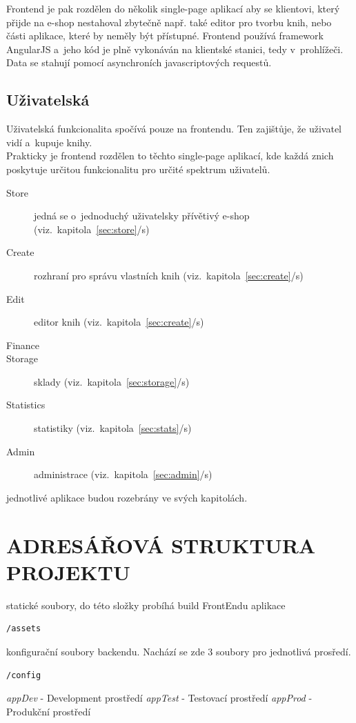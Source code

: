 \documentclass[a4paper,12pt,twoside,BCOR=10mm]{article}
\newcommand{\upc}[1]{\uppercase{#1}} %
\newcommand{\odkazNaKapitolu}[1]{(viz.~kapitola~\ref{#1}/s\pageref{#1})}
\renewcommand{\it}[1]{\textit{#1}}    %
\newenvironment{codeframe}{%
  \begin{Sbox} 
    \begin{minipage} 
      {\columnwidth-\leftmargin-\rightmargin-2\fboxsep-2\fboxrule-4pt} 
}{%

  \end{minipage} 
  \end{Sbox} 
  \begin{center} 
    \fcolorbox{black}{codeback}{\TheSbox} 
  \end{center} 
}
\begin{document}
Frontend je pak rozdělen do několik single-page aplikací aby se klientovi, který přijde na e-shop nestahoval zbytečně např. také editor pro tvorbu knih, nebo části aplikace, které by neměly být přístupné. Frontend používá framework AngularJS a~jeho kód je plně vykonáván na klientské stanici, tedy v~prohlížeči. Data se stahují pomocí asynchroních javascriptových requestů.\\

\subsection{Uživatelská}
Uživatelská funkcionalita spočívá pouze na frontendu. Ten zajištůje, že uživatel vidí a~kupuje knihy.\\

Prakticky je frontend rozdělen to těchto single-page aplikací, kde každá znich poskytuje určitou funkcionalitu pro určité spektrum uživatelů.\\

\begin{description}
 \item[Store] jedná se o~jednoduchý uživatelsky přívětivý e-shop \odkazNaKapitolu{sec:store}
 \item[Create] rozhraní pro správu vlastních knih \odkazNaKapitolu{sec:create}
 \item[Edit] editor knih \odkazNaKapitolu{sec:create}
 \item[Finance]
 \item[Storage] sklady \odkazNaKapitolu{sec:storage}
 \item[Statistics] statistiky \odkazNaKapitolu{sec:stats}
 \item[Admin] administrace \odkazNaKapitolu{sec:admin}
\end{description}

jednotlivé aplikace budou rozebrány ve svých kapitolách.

\section{\upc{Adresářová struktura projektu}}

statické soubory, do této složky probíhá build FrontEndu aplikace
\begin{codeframe}
  \begin{verbatim}
/assets
  \end{verbatim}
\end{codeframe}

konfigurační soubory backendu. Nachází se zde 3 soubory pro jednotlivá prosředí.\newline
\begin{codeframe}
  \begin{verbatim}
/config
  \end{verbatim}
\end{codeframe}
\it{appDev} - Development prostředí\newline
\it{appTest} - Testovací prostředí\newline
\it{appProd} - Produkční prostředí
\end{document}
